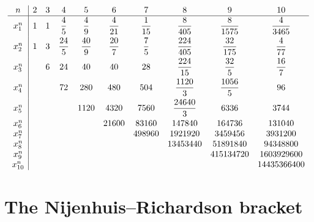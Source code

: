 \documentclass[pdftex]{sigma}
\numberwithin{equation}{section}
\begin{document}
\begin{table}\caption{Values of $x^n_i=(-1)^{n}n! c^n_i$ for $n\le 10$, see Theorem~\ref{thm.standardform}.}\label{tab.coefficienti}
\renewcommand\arraystretch{1.2}
$$ \begin{array}{c|cccccccccc}
n&2&3&4&5&6&7&8&9&10\\
\hline
\vphantom{\begin{matrix}1\\ 1\end{matrix}}x_1^n
&1&1&\dfrac{4}{5}&\dfrac{4}{9}&\dfrac{4}{21}&\dfrac{1}{15}&\dfrac{8}{405}&\dfrac{8}{1575}&\dfrac{4}{3465}\\
\vphantom{\begin{matrix}1\\ 1\end{matrix}}
x_2^n&1&3&\dfrac{24}{5}&\dfrac{40}{9}&\dfrac{20}{7}&\dfrac{7}{5}&\dfrac{224}{405}&\dfrac{32}{175}&\dfrac{4}{77}\\
\vphantom{\begin{matrix}1\\ 1\end{matrix}}
x_3^n&&6&24&40&40&28&\dfrac{224}{15}&\dfrac{32}{5}&\dfrac{16}{7}\\
\vphantom{\begin{matrix}1\\ 1\end{matrix}}
x_4^n&&&72&280&480&504&\dfrac{1120}{3}&\dfrac{1056}{5}&96\\
\vphantom{\begin{matrix}1\\ 1\end{matrix}}
x_5^n&&&&1120&4320&7560&\dfrac{24640}{3}&6336&3744\\
x_6^n&&&&&21600&83160&147840&164736&131040\\
x_7^n&&&&&&498960&1921920&3459456&3931200\\
x_8^n&&&&&&&13453440&51891840&94348800\\
x_9^n&&&&&&&&415134720&1603929600\\
x_{10}^n&&&&&&&&&14435366400
\end{array}$$
\renewcommand\arraystretch{1}
\end{table}

\section{The Nijenhuis--Richardson bracket}\label{sec.NR}
\end{document}
